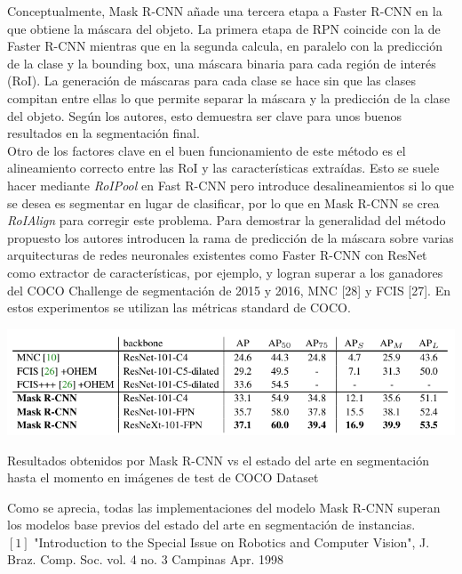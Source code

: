 \documentclass{bmvc2k}
\begin{document}
Conceptualmente, Mask R-CNN añade una tercera etapa a Faster R-CNN en la que obtiene la máscara del objeto. La primera etapa de RPN coincide con la de Faster R-CNN mientras que en la segunda calcula, en paralelo con la predicción de la clase y la bounding box, una máscara binaria para cada región de interés (RoI). La generación de máscaras para cada clase se hace sin que las clases compitan entre ellas lo que permite separar la máscara y la predicción de la clase del objeto. Según los autores, esto demuestra ser clave para unos buenos resultados en la segmentación final.\\ 
Otro de los factores clave en el buen funcionamiento de este método es el alineamiento correcto entre las RoI y las características extraídas. Esto se suele hacer mediante \textit{RoIPool} en Fast R-CNN pero introduce desalineamientos si lo que se desea es segmentar en lugar de clasificar, por lo que en Mask R-CNN se crea \textit{RoIAlign} para corregir este problema. Para demostrar la generalidad del método propuesto los autores introducen la rama de predicción de la máscara sobre varias arquitecturas de redes neuronales existentes como Faster R-CNN con ResNet como extractor de características, por ejemplo, y logran superar a los ganadores del COCO Challenge de segmentación de 2015 y 2016, MNC [28] y FCIS [27]. En estos experimentos se utilizan las métricas standard de COCO.
\begin{table}[h!]
\begin{center}
\includegraphics[scale=0.40]{mask_vs_mnc_fcis.png}
\caption{Resultados obtenidos por Mask R-CNN vs el estado del arte en segmentación hasta el momento en imágenes de test de COCO Dataset}
\end{center}
\end{table}
Como se aprecia, todas las implementaciones del modelo Mask R-CNN superan los modelos base previos del estado del arte en segmentación de instancias.
\\
$\left[1\right]$  "Introduction to the Special Issue on Robotics and Computer Vision", J. Braz. Comp. Soc. vol. 4 no. 3 Campinas Apr. 1998\\
\end{document}
